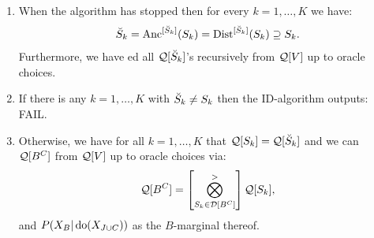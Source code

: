 \begin{Alg}[ID-algorithm]
\begin{enumerate}
\begin{enumerate}
                \item If $D_{k,\ell}=A_{k,\ell}$ or $A_{k,\ell+1}=D_{k,\ell}$ then stop for this $k$ and put: 
                    \[ \idc S_k:=D_{k,\ell}.\]
                \item[] Otherwise, repeat with: $\ell \leftarrow \ell +1$.
            \end{enumerate}
                \item When the algorithm has stopped then for every $k=1,\dots,K$ we have:
                    \[ \breve{S}_k=\mathrm{Anc}^{[\breve{S}_k]}(S_k)=\mathrm{Dist}^{[\breve{S}_k]}(S_k) \supseteq S_k.\]
                    Furthermore, we have \track ed all $\mathcal{Q}[\breve{S}_k]$'s recursively from $\mathcal{Q}[V]$ up to oracle choices.
                \item If there is any $k=1,\dots,K$ with $\breve{S}_k \neq S_k$ then the ID-algorithm outputs: FAIL.
                \item Otherwise, we have for all $k=1,\dots,K$ that $\mathcal{Q}[S_k]=\mathcal{Q}[\breve{S}_k]$ and we can \track\
                    $\mathcal{Q}[B^C]$ from $\mathcal{Q}[V]$ up to oracle choices via:
                    \[ \mathcal{Q}[B^C] = \left [ \bigotimes_{S_k \in \mathcal{D}[B^C]}^> \right ] \mathcal{Q}[S_k],\]
                    and $P(X_B|\operatorname{do}(X_{J \cup C}))$ as the $B$-marginal thereof.
    \end{enumerate}
\end{Alg}



